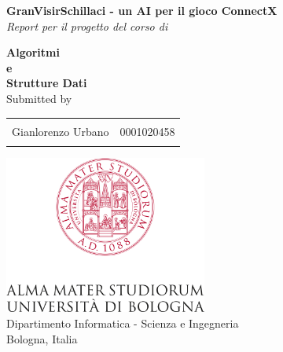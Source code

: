 \begin{titlepage}

       \begin{center}

              \Large \textbf {GranVisirSchillaci - un AI per il gioco ConnectX}\\[0.5in]

              \small \emph{Report per il progetto del corso di}
              \vspace{.2in}

              {\bf Algoritmi \\e\\ Strutture Dati}\\[0.5in]

              \normalsize Submitted by \\
              \begin{table}[h]
                     \centering
                     \begin{tabular}{lr}\hline           \\
                            Gianlorenzo Urbano & 0001020458 \\
                            \\ \hline
                     \end{tabular}
              \end{table}

              \vfill

              \includegraphics[width=0.5\textwidth]{./images/alma}\\[0.1in]
              \Large{Dipartimento Informatica - Scienza e Ingegneria}\\
              \normalsize
              Bologna, Italia \\
              \vspace{0.2cm}

       \end{center}

\end{titlepage}
